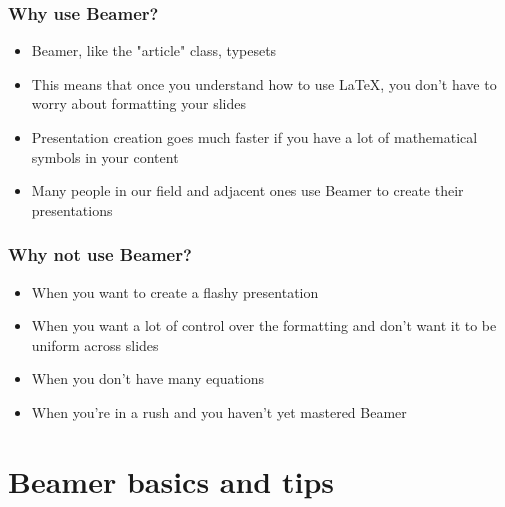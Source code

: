 \documentclass{beamer}
\begin{document}



\begin{frame}
\frametitle{Why use Beamer?}

\begin{itemize}
    \item<1-> Beamer, like the "article" class, typesets
    \item<2-> This means that once you understand how to use \LaTeX, you don't have to worry about formatting your slides
    \item<3-> Presentation creation goes much faster if you have a lot of mathematical symbols in your content
    \item<4> Many people in our field and adjacent ones use Beamer to create their presentations
\end{itemize}
\end{frame}




\begin{frame}
\frametitle{Why not use Beamer?}

\begin{itemize}
    \item<1-> When you want to create a \alert{flashy} presentation
    \item<2-> When you want a lot of control over the formatting and don't want it to be uniform across slides
    \item<3-> When you don't have many equations
    \item<4> When you're in a rush and you haven't yet mastered Beamer
\end{itemize}
\end{frame}


\section{Beamer basics and tips}
\end{document}
